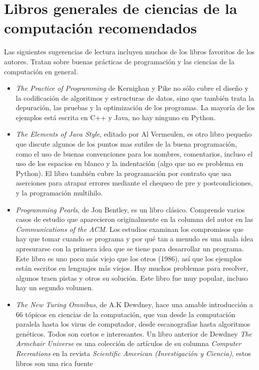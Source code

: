 \section{Libros generales de ciencias de la computación recomendados}

Las siguientes sugerencias de lectura incluyen muchos de los libros
favoritos de los autores. Tratan sobre buenas prácticas de programación
y las ciencias de la computación en general.
\begin{itemize}
\item {\em The Practice of Programming} de Kernighan y Pike no sólo cubre
el diseño y la codificación de algoritmos y estructuras de datos,
sino que también trata la depuración, las pruebas y la optimización
de los programas. La mayoría de los ejemplos está escrita en C++ y
Java, no hay ninguno en Python.
\item {\em The Elements of Java Style}, editado por Al Vermeulen, es
otro libro pequeño que discute algunos de los puntos mas sutiles de
la buena programación, como el uso de buenas convenciones para los
nombres, comentarios, incluso el uso de los espacios en blanco y la
indentación (algo que no es problema en Python). El libro también
cubre la programación por contrato que usa aserciones para atrapar
errores mediante el chequeo de pre y postcondiciones, y la programación
multihilo.
\item {\em Programming Pearls}, de Jon Bentley, es un libro clásico.
Comprende varios casos de estudio que aparecieron originalmente en
la columna del autor en las {\em Communications of the ACM}. Los
estudios examinan los compromisos que hay que tomar cuando se programa
y por qué tan a menudo es una mala idea apresurarse con la primera
idea que se tiene para desarrollar un programa. Este libro es uno
poco más viejo que los otros (1986), así que los ejemplos están escritos
en lenguajes más viejos. Hay muchos problemas para resolver, algunos
traen pistas y otros su solución. Este libro fue muy popular, incluso
hay un segundo volumen.
\item {\em The New Turing Omnibus}, de A.K Dewdney, hace una amable introducción
a 66 tópicos en ciencias de la computación, que van desde la computación
paralela hasta los virus de computador, desde escanografías hasta
algoritmos genéticos. Todos son cortos e interesantes. Un libro anterior
de Dewdney {\em The Armchair Universe} es una colección de artículos
de su columna {\em Computer Recreations} en la revista {\em Scientific
American (Investigación y Ciencia)}, estos libros son una rica fuente

\end{itemize}
